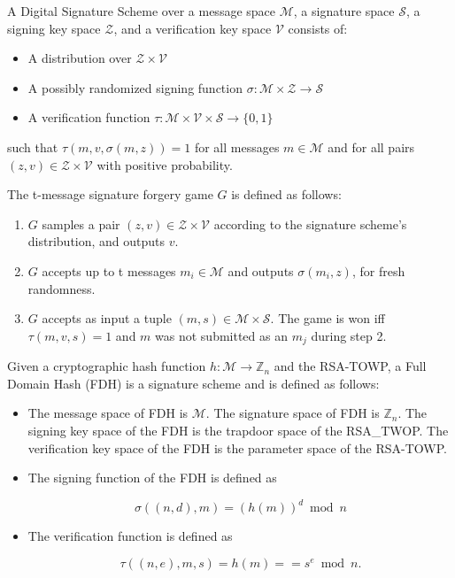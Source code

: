 \documentclass[a4paper,german]{article}
\newenvironment{customdef}[1]{\renewcommand\theinnercustomdef{#1}\innercustomdef}{\endinnercustomdef}
\begin{document}
\begin{customdef}{3.17}
	A Digital Signature Scheme over a message space $\mathcal{M}$, a signature space $\mathcal{S}$, a signing key space $\mathcal{Z}$, and a verification key space $\mathcal{V}$ consists of:

	\begin{itemize}

		\item  A distribution over $\mathcal{Z \times V}$
		\item  A possibly randomized signing function $\sigma : \mathcal{M \times Z} \rightarrow \mathcal{S}$
		\item  A verification function $\tau : \mathcal{M \times V \times S} \rightarrow \{0, 1\}$
	\end{itemize}

	such that $\tau(m, v, \sigma(m, z)) = 1$ for all messages $m \in \mathcal{M}$ and for all pairs $(z, v) \in \mathcal{Z \times V}$ with positive probability.
\end{customdef}

\begin{customdef}{3.18}
	The t-message signature forgery game $G$ is defined as follows:

	\begin{enumerate}

		\item  $G$ samples a pair $(z, v) \in \mathcal{Z \times V}$ according to the signature scheme's distribution, and outputs $v$.

		\item  $G$ accepts up to t messages $m_i \in \mathcal{M}$ and outputs $\sigma(m_i, z)$, for fresh randomness.
		\item  $G$ accepts as input a tuple $(m, s) \in \mathcal{M \times S}$. The game is won iff $\tau(m, v, s) = 1$ and $m$ was not submitted as an $m_j$ during step 2.

	\end{enumerate}
\end{customdef}

\begin{customdef}{FDH}
	Given a cryptographic hash function $h: \mathcal{M} \rightarrow \mathbb{Z}_n$ and the RSA-TOWP, a Full Domain Hash (FDH) is a signature scheme and is defined as follows:

	\begin{itemize}

		\item  The message space of FDH is $\mathcal{M}$. The signature space of FDH is $\mathbb{Z}_n$. The signing key space of the FDH is the trapdoor space of the RSA\_TWOP. The verification key space of the FDH is the parameter space of the RSA-TOWP.
		\item  The signing function of the FDH is defined as

			\[
				\sigma((n, d), m) = (h(m))^d \bmod n
			\]
		\item  The verification function is defined as

			\[
				\tau((n, e), m, s) = h(m) == s^e \bmod n
			.\]

	\end{itemize}
\end{customdef}
\end{document}
